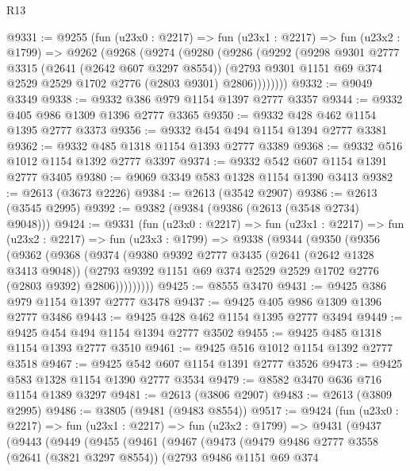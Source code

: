 \begin{lexlean}{R13}
\begin{coremodule}
@9331 := @9255
    (fun (u23x0 : @2217) =>
    fun (u23x1 : @2217) =>
    fun (u23x2 : @1799) =>
    @9262
      (@9268
        (@9274
          (@9280
            (@9286
              (@9292
                (@9298
                  @9301
                  @2777
                  @3315
                  (@2641 (@2642 @607 @3297 @8554))
                  (@2793 @9301 @1151 @69 @374 @2529 @2529 @1702 @2776 (@2803 @9301) @2806))))))))
@9332 := @9049 @3349
@9338 := @9332 @386 @979 @1154 @1397 @2777 @3357
@9344 := @9332 @405 @986 @1309 @1396 @2777 @3365
@9350 := @9332 @428 @462 @1154 @1395 @2777 @3373
@9356 := @9332 @454 @494 @1154 @1394 @2777 @3381
@9362 := @9332 @485 @1318 @1154 @1393 @2777 @3389
@9368 := @9332 @516 @1012 @1154 @1392 @2777 @3397
@9374 := @9332 @542 @607 @1154 @1391 @2777 @3405
@9380 := @9069 @3349 @583 @1328 @1154 @1390 @3413
@9382 := @2613 (@3673 @2226)
@9384 := @2613 (@3542 @2907)
@9386 := @2613 (@3545 @2995)
@9392 := @9382 (@9384 (@9386 (@2613 (@3548 @2734) @9048)))
@9424 := @9331
    (fun (u23x0 : @2217) =>
    fun (u23x1 : @2217) =>
    fun (u23x2 : @2217) =>
    fun (u23x3 : @1799) =>
    @9338
      (@9344
        (@9350
          (@9356
            (@9362
              (@9368
                (@9374
                  (@9380
                    @9392
                    @2777
                    @3435
                    (@2641 (@2642 @1328 @3413 @9048))
                    (@2793 @9392 @1151 @69 @374 @2529 @2529 @1702 @2776 (@2803 @9392) @2806)))))))))
@9425 := @8555 @3470
@9431 := @9425 @386 @979 @1154 @1397 @2777 @3478
@9437 := @9425 @405 @986 @1309 @1396 @2777 @3486
@9443 := @9425 @428 @462 @1154 @1395 @2777 @3494
@9449 := @9425 @454 @494 @1154 @1394 @2777 @3502
@9455 := @9425 @485 @1318 @1154 @1393 @2777 @3510
@9461 := @9425 @516 @1012 @1154 @1392 @2777 @3518
@9467 := @9425 @542 @607 @1154 @1391 @2777 @3526
@9473 := @9425 @583 @1328 @1154 @1390 @2777 @3534
@9479 := @8582 @3470 @636 @716 @1154 @1389 @3297
@9481 := @2613 (@3806 @2907)
@9483 := @2613 (@3809 @2995)
@9486 := @3805 (@9481 (@9483 @8554))
@9517 := @9424
    (fun (u23x0 : @2217) =>
    fun (u23x1 : @2217) =>
    fun (u23x2 : @1799) =>
    @9431
      (@9437
        (@9443
          (@9449
            (@9455
              (@9461
                (@9467
                  (@9473
                    (@9479
                      @9486
                      @2777
                      @3558
                      (@2641 (@3821 @3297 @8554))
                      (@2793
                        @9486
                        @1151
                        @69
                        @374

\end{coremodule}
\end{lexlean}
